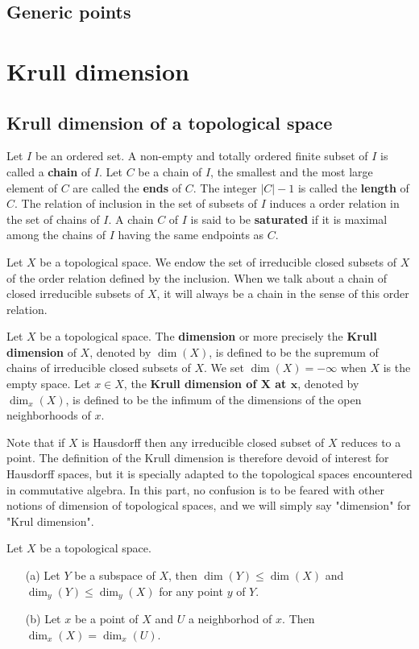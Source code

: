 \subsection{Generic points}

\section{Krull dimension}
\subsection{Krull dimension of a topological space}
\begin{definition}
Let $I$ be an ordered set. A non-empty and totally ordered finite subset of $I$ is called a \textbf{chain} of $I$. Let $C$ be a chain of $I$, the smallest and the most large element of $C$ are called the \textbf{ends} of $C$. The integer $|C|-1$ is called the \textbf{length} of $C$. The relation of inclusion in the set of subsets of $I$ induces a order relation in the set of chains of $I$. A chain $C$ of $I$ is said to be \textbf{saturated} if it is maximal among the chains of $I$ having the same endpoints as $C$.
\end{definition}
Let $X$ be a topological space. We endow the set of irreducible closed subsets of $X$ of the order relation defined by the inclusion. When we talk about a chain of closed irreducible subsets of $X$, it will always be a chain in the sense of this order relation.
\begin{definition}
Let $X$ be a topological space. The \textbf{dimension} or more precisely the \textbf{Krull dimension} of $X$, denoted by $\dim(X)$, is defined to be the supremum of chains of irreducible closed subsets of $X$. We set $\dim(X)=-\infty$ when $X$ is the empty space. Let $x\in X$, the \textbf{Krull dimension of $\bm{X}$ at $\bm{x}$}, denoted by $\dim_x(X)$, is defined to be the infimum of the dimensions of the open neighborhoods of $x$.
\end{definition}
Note that if $X$ is Hausdorff then any irreducible closed subset of $X$ reduces to a point. The definition of the Krull dimension is therefore devoid of interest for Hausdorff spaces, but it is specially adapted to the topological spaces encountered in commutative algebra. In this part, no confusion is to be feared with other notions of dimension of topological spaces, and we will simply say "dimension" for "Krul dimension".
\begin{proposition}\label{topo space Krull dimension prop}
Let $X$ be a topological space.
\begin{itemize}
\item[(a)] Let $Y$ be a subspace of $X$, then $\dim(Y)\leq\dim(X)$ and $\dim_y(Y)\leq\dim_y(X)$ for any point $y$ of $Y$.
\item[(b)] Let $x$ be a point of $X$ and $U$ a neighborhod of $x$. Then $\dim_x(X)=\dim_x(U)$.
\end{itemize}
\end{proposition}
